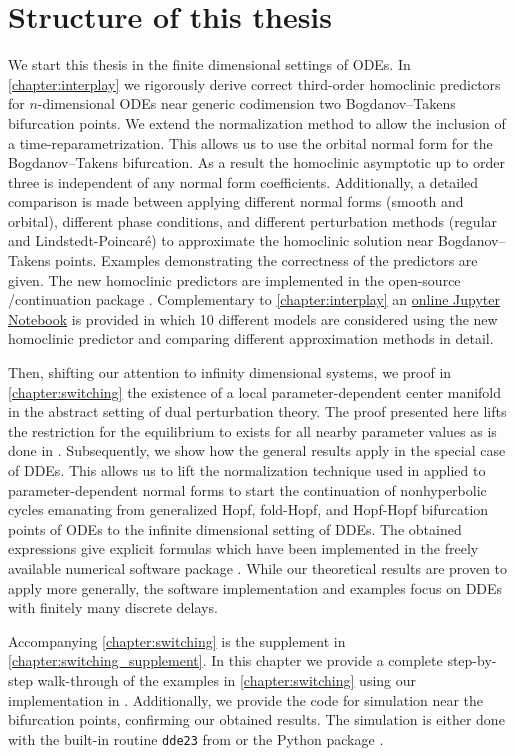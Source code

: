 \section{Structure of this thesis}
We start this thesis in the finite dimensional settings of ODEs. In
\cref{chapter:interplay} we rigorously derive correct third-order homoclinic
predictors for $n$-dimensional ODEs near generic codimension two Bogdanov--Takens
bifurcation points. We extend the normalization method to allow the inclusion of
a time-reparametrization. This allows us to use the orbital normal form for the
Bogdanov--Takens bifurcation. As a result the homoclinic asymptotic up to order
three is independent of any normal form coefficients. Additionally, a detailed
comparison is made between applying different normal forms (smooth and orbital),
different phase conditions, and different perturbation methods (regular and
Lindstedt-Poincar\'e) to approximate the homoclinic solution near
Bogdanov--Takens points.  Examples demonstrating the correctness of the
predictors are given. The new homoclinic predictors are implemented in the
open-source \MATLAB/\OCTAVE continuation package \MATCONT. Complementary to
\cref{chapter:interplay} an
\href{https://mmbosschaert.github.io/MatCont7p2NewInitBTHom-/}{online Jupyter
Notebook} is provided in which 10 different models are considered using the new
homoclinic predictor and comparing different approximation methods in detail.

Then, shifting our attention to infinity dimensional systems,  we proof in
\cref{chapter:switching} the existence of a local parameter-dependent center
manifold in the abstract setting of dual perturbation theory. The proof
presented here lifts the restriction for the equilibrium to exists for all
nearby parameter values as is done in \cite{diekmann1995delay}. Subsequently,
we show how the general results apply in the special case of DDEs. This allows
us to lift the normalization technique used in \cite{Kuznetsov2008} applied to
parameter-dependent normal forms to start the continuation of nonhyperbolic
cycles emanating from generalized Hopf, fold-Hopf, and Hopf-Hopf bifurcation
points of ODEs to the infinite dimensional setting of DDEs. The obtained
expressions give explicit formulas which have been implemented in the freely
available numerical software package \DDEBIFTOOL. While our theoretical results
are proven to apply more generally, the software implementation and examples
focus on DDEs with finitely many discrete delays.

Accompanying \cref{chapter:switching} is the supplement in
\cref{chapter:switching_supplement}. In this chapter we provide a complete
step-by-step walk-through of the examples in \cref{chapter:switching} using our
implementation in \DDEBIFTOOL. Additionally, we provide the code for simulation
near the bifurcation points, confirming our obtained results. The simulation is
either done with the built-in routine \lstinline|dde23| from \MATLAB
\cite{Shampine01solvingdelay} or the Python package \PYDELAY
\cite{Flunkert2009Flunkert}.

